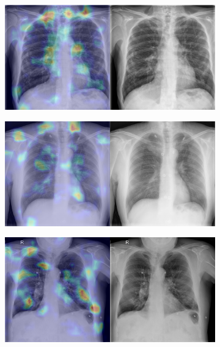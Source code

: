 \begin{figure}[b]
\begin{subfigure}{0.4\textwidth}
    \end{subfigure}
    \begin{subfigure}{0.4\textwidth}
        \centering
        \includegraphics[width=1.0\textwidth]{Chapters/5. Conclusiones/img/COVID-19/1_1_4be426760e00_16d85c7f7837.png}
    \end{subfigure}
    \begin{subfigure}{0.4\textwidth}
        \centering
        \includegraphics[width=1.0\textwidth]{Chapters/5. Conclusiones/img/COVID-19/1_1_7b6c49da06db_b6b631939d4f.png}
    \end{subfigure}
    \begin{subfigure}{0.4\textwidth}
        \centering
        \includegraphics[width=1.0\textwidth]{Chapters/5. Conclusiones/img/COVID-19/1_1_cde0ab9526da_fa935d855d4e.png}

\end{subfigure}
\end{figure}
